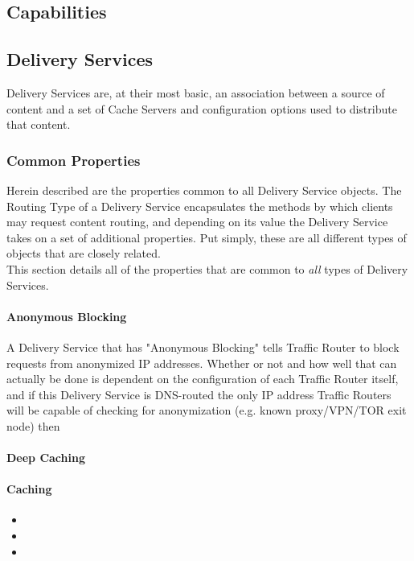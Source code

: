 \subsection{Capabilities}


\subsection{Delivery Services}
Delivery Services are, at their most basic, an association between a source of
content and a set of Cache Servers and configuration options used to distribute
that content.

\subsubsection{Common Properties}
Herein described are the properties common to all Delivery Service objects. The
Routing Type of a Delivery Service encapsulates the methods by which clients
may request content routing, and depending on its value the Delivery Service
takes on a set of additional properties. Put simply, these are all different
types of objects that are closely related.\\
This section details all of the properties that are common to \emph{all} types of
Delivery Services.

\paragraph{Anonymous Blocking}
A Delivery Service that has "Anonymous Blocking" tells Traffic Router to block
requests from anonymized IP addresses. Whether or not and how well that can
actually be done is dependent on the configuration of each Traffic Router itself,
and if this Delivery Service is DNS-routed the only IP address Traffic Routers
will be capable of checking for anonymization (e.g. known proxy/VPN/TOR exit node)
then

\paragraph{Deep Caching}

\paragraph{Caching}
\begin{itemize}
	\item {}
	\item {}
	\item {}
\end{itemize}

